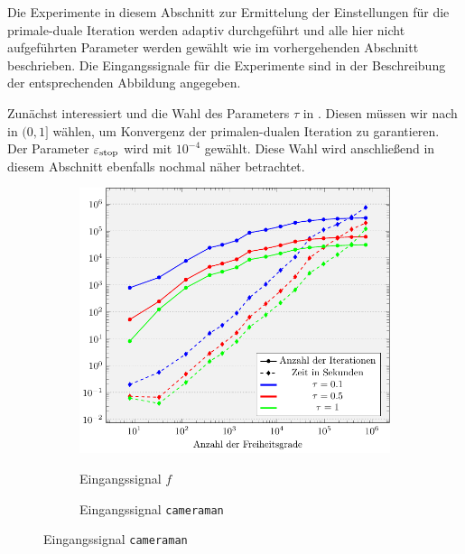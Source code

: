 Die Experimente in diesem Abschnitt zur Ermittelung der Einstellungen
für die primale-duale Iteration werden adaptiv durchgeführt und alle hier
nicht aufgeführten Parameter werden gewählt wie im vorhergehenden Abschnitt
beschrieben.
Die Eingangssignale für die Experimente sind in der Beschreibung der 
entsprechenden Abbildung angegeben.

Zunächst interessiert und die Wahl des Parameters $\tau$ in 
. 
Diesen müssen wir nach  in $(0,1]$ wählen, um
Konvergenz der primalen-dualen Iteration zu garantieren.
Der Parameter $\varepsilon_{\textup{stop}}$ wird mit $10^{-4}$ gewählt. 
Diese Wahl wird anschließend in diesem Abschnitt ebenfalls nochmal näher
betrachtet. 
\begin{figure}[p]
  \centering
  \begin{subfigure}[b]{.48\linewidth}
    \caption{Eingangssignal $f$}
    \includegraphics[width=\linewidth]
      {pictures/chapExperiments/secParameters/parTau/f01/miscF.pdf}
    \label{fig:parTauMiscF}
  \end{subfigure}
  \quad
  \begin{subfigure}[b]{.48\linewidth}
    \centering
    \caption{Eingangssignal \texttt{cameraman}}

\end{subfigure}
\end{figure}
